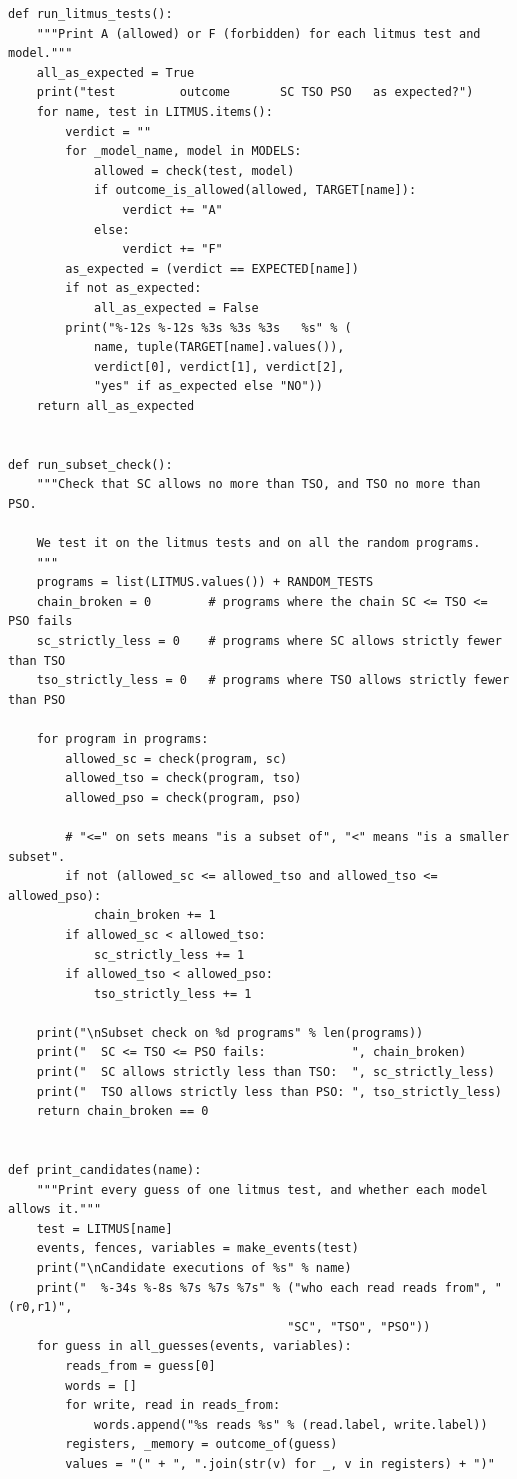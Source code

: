 \begin{lstlisting}[style=vspython]
def run_litmus_tests():
    """Print A (allowed) or F (forbidden) for each litmus test and model."""
    all_as_expected = True
    print("test         outcome       SC TSO PSO   as expected?")
    for name, test in LITMUS.items():
        verdict = ""
        for _model_name, model in MODELS:
            allowed = check(test, model)
            if outcome_is_allowed(allowed, TARGET[name]):
                verdict += "A"
            else:
                verdict += "F"
        as_expected = (verdict == EXPECTED[name])
        if not as_expected:
            all_as_expected = False
        print("%-12s %-12s %3s %3s %3s   %s" % (
            name, tuple(TARGET[name].values()),
            verdict[0], verdict[1], verdict[2],
            "yes" if as_expected else "NO"))
    return all_as_expected


def run_subset_check():
    """Check that SC allows no more than TSO, and TSO no more than PSO.

    We test it on the litmus tests and on all the random programs.
    """
    programs = list(LITMUS.values()) + RANDOM_TESTS
    chain_broken = 0        # programs where the chain SC <= TSO <= PSO fails
    sc_strictly_less = 0    # programs where SC allows strictly fewer than TSO
    tso_strictly_less = 0   # programs where TSO allows strictly fewer than PSO

    for program in programs:
        allowed_sc = check(program, sc)
        allowed_tso = check(program, tso)
        allowed_pso = check(program, pso)

        # "<=" on sets means "is a subset of", "<" means "is a smaller subset".
        if not (allowed_sc <= allowed_tso and allowed_tso <= allowed_pso):
            chain_broken += 1
        if allowed_sc < allowed_tso:
            sc_strictly_less += 1
        if allowed_tso < allowed_pso:
            tso_strictly_less += 1

    print("\nSubset check on %d programs" % len(programs))
    print("  SC <= TSO <= PSO fails:            ", chain_broken)
    print("  SC allows strictly less than TSO:  ", sc_strictly_less)
    print("  TSO allows strictly less than PSO: ", tso_strictly_less)
    return chain_broken == 0


def print_candidates(name):
    """Print every guess of one litmus test, and whether each model allows it."""
    test = LITMUS[name]
    events, fences, variables = make_events(test)
    print("\nCandidate executions of %s" % name)
    print("  %-34s %-8s %7s %7s %7s" % ("who each read reads from", "(r0,r1)",
                                       "SC", "TSO", "PSO"))
    for guess in all_guesses(events, variables):
        reads_from = guess[0]
        words = []
        for write, read in reads_from:
            words.append("%s reads %s" % (read.label, write.label))
        registers, _memory = outcome_of(guess)
        values = "(" + ", ".join(str(v) for _, v in registers) + ")"


\end{lstlisting}
